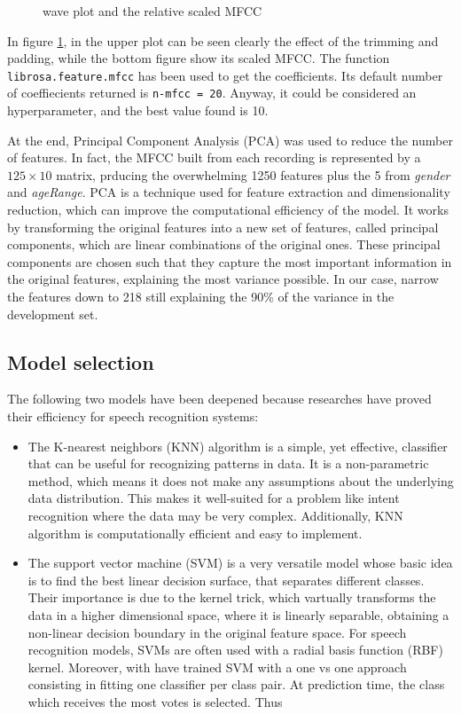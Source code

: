 \documentclass[conference]{IEEEtran}
\begin{document}
\begin{figure}
    \centering
    
    \caption{wave plot and the relative scaled MFCC}
    \label{fig:mfcc}
\end{figure}

In figure \ref{fig:mfcc}, in the upper plot can be seen clearly the effect of the trimming and padding, while the bottom figure show its scaled MFCC. 
The function \texttt{librosa.feature.mfcc} has been used to get the coefficients.
Its default number of coeffiecients returned is \texttt{n-mfcc = 20}.
Anyway, it could be considered an hyperparameter, and the best value found is 10.

At the end, Principal Component Analysis (PCA) was used to reduce the number of features.
In fact, the MFCC built from each recording is represented by a $125 \times 10$ matrix, prducing the overwhelming 1250 features plus the 5 from \textit{gender} and \textit{ageRange}.
PCA is a technique used for feature extraction and dimensionality reduction, which can improve the computational efficiency of the model.
It works by transforming the original features into a new set of features, called principal components, which are linear combinations of the original ones.
These principal components are chosen such that they capture the most important information in the original features, explaining the most variance possible.
In our case, narrow the features down to 218 still explaining the 90\% of the variance in the development set.

\subsection{Model selection}
The following two models have been deepened because researches have proved their efficiency for speech recognition systems:
\begin{itemize}
    \item The K-nearest neighbors (KNN) algorithm is a simple, yet effective, classifier that can be useful for recognizing patterns in data.
    It is a non-parametric method, which means it does not make any assumptions about the underlying data distribution.
    This makes it well-suited for a problem like intent recognition where the data may be very complex.
    Additionally, KNN algorithm is computationally efficient and easy to implement.

    \item The support vector machine (SVM) is a very versatile model whose basic idea is to find the best linear decision surface, that separates different classes.
    Their importance is due to the kernel trick, which vartually transforms the data in a higher dimensional space, where it is linearly separable, obtaining a non-linear decision boundary in the original feature space.
    For speech recognition models, SVMs are often used with a radial basis function (RBF) kernel.
    Moreover, with have trained SVM with a one vs one approach consisting in fitting one classifier per class pair.
    At prediction time, the class which receives the most votes is selected.
    Thus
\end{itemize}
\end{document}

